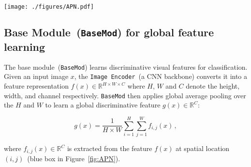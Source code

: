 \begin{figure*}[tb]
\label{APN}
  \centering
\texttt{[image: ./figures/APN.pdf]}
    \caption{
    }
  \label{fig:APN}
\end{figure*}



\subsection{Base Module~(\texttt{BaseMod}) for global feature learning}





The base module~(\texttt{BaseMod}) learns discriminative visual features for classification. Given an input image $x$, the \texttt{Image Encoder}~(a CNN backbone) converts it into a feature representation $f(x)\in \mathbb{R}^{H\times W \times C}$ where $H$, $W$ and $C$ denote the height, width, and channel respectively.
\texttt{BaseMod} then applies global average pooling over the $H$ and $W$ to learn a global discriminative feature $g(x)\in \mathbb{R}^C$:
\begin{linenomath*}
\begin{equation}
\label{eq:GAP}
    g(x) = \frac{1}{H \times W} \sum_{i=1}^{H} \sum_{j=1}^{W} {f_{i,j}(x)} \,,
\end{equation}
\end{linenomath*}
where $f_{i,j}(x) \in \mathbb{R}^C$ is extracted from the  feature $f(x)$ at spatial location $(i, j)$~(blue box in Figure~\ref{fig:APN}).





